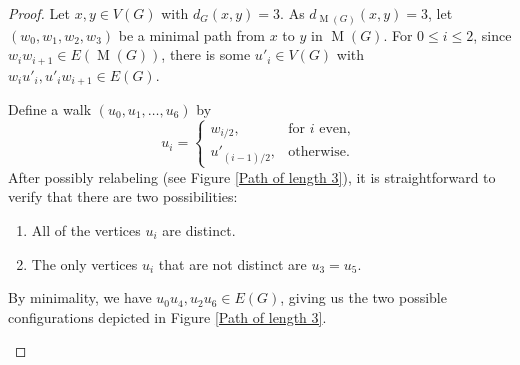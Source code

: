 \documentclass[12pt]{amsart}
\theoremstyle{definition}
\theoremstyle{remark}
\numberwithin{equation}{section}
\numberwithin{figure}{section}
\newcommand{\M}{\operatorname{M}}
\begin{document}
\begin{proof}
    Let $x,y \in V(G)$ with $d_G(x,y) = 3$. As $d_{\M(G)}(x,y) = 3$, let $(w_0,w_1,w_2,w_3)$ be a minimal path from $x$ to $y$ in $\M(G)$. For $0\leq i \leq 2$, since $w_i w_{i+1} \in E(\M(G))$, there is some $u'_i \in V(G)$ with $w_iu'_i,u'_iw_{i+1} \in E(G)$. 
    
    Define a walk $(u_0,u_1,\dots,u_6)$ by
    \[
        u_i =
        \begin{cases}
            w_{i/2}, & \text{for $i$ even}, \\
            u'_{(i-1)/2}, &\text{otherwise.}
        \end{cases}
    \]
    After possibly relabeling (see Figure \ref{Path of length 3}), it is straightforward to verify that there are two possibilities:
    \begin{enumerate}
        \item All of the vertices $u_i$ are distinct.
        \item The only vertices $u_i$ that are not distinct are $u_3 = u_5$.
    \end{enumerate}
    
    By minimality, we have $u_0u_4,u_2u_6\in E(G)$, giving us the two possible configurations depicted in Figure \ref{Path of length 3}.    
        \begin{figure}[h!]
        \begin{center}
\end{center}
\end{figure}
\end{proof}
\end{document}
